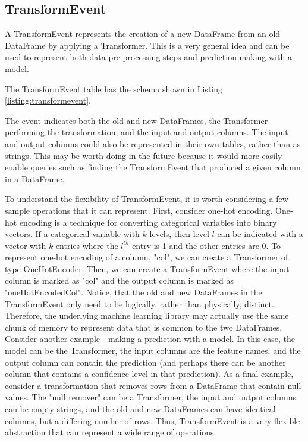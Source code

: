 \subsection{TransformEvent}
A TransformEvent represents the creation of a new DataFrame from an old DataFrame by
applying a Transformer. This is a very general idea and can be used to represent both
data pre-processing steps and prediction-making with a model.

The TransformEvent table has the schema shown in Listing \ref{listing:transformevent}.

The event indicates both the old and new DataFrames, the Transformer performing
the transformation, and the input and output columns. The input and output columns
could also be represented in their own tables, rather than as strings. This may
be worth doing in the future because it would more easily enable queries such as
finding the TransformEvent that produced a given column in a DataFrame.

To understand the flexibility of TransformEvent, it is worth considering a few
sample operations that it can represent. First, consider one-hot encoding. One-hot
encoding is a technique for converting categorical variables into binary vectors.
If a categorical variable with $k$ levels, then level $l$ can be indicated with
a vector with $k$ entries where the $l^{th}$ entry is 1 and the other entries are
0. To represent one-hot encoding of a column, "col", we can create a Transformer of
type OneHotEncoder. Then, we can create a TransformEvent where the input column
is marked as "col" and the output column is marked as "oneHotEncodedCol". Notice,
that the old and new DataFrames in the TransformEvent only need to be logically, rather
than physically, distinct. Therefore, the underlying machine learning library may
actually use the same chunk of memory to represent data that is common to the two 
DataFrames. Consider another example - making a prediction with a model. In this
case, the model can be the Transformer, the input columns are the feature names,
and the output column can contain the prediction (and perhaps there can be another
column that contains a confidence level in that prediction). As a final example,
consider a transformation that removes rows from a DataFrame that contain null values.
The "null remover" can be a Transformer, the input and output columns can be empty
strings, and the old and new DataFrames can have identical columns, but a differing
number of rows. Thus, TransformEvent is a very flexible abstraction that can represent
a wide range of operations.

